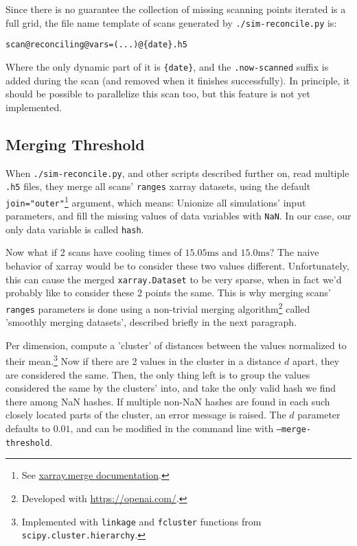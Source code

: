 Since there is no guarantee the collection of missing scanning points iterated is a full grid, the file name template of scans generated by \texttt{./sim-reconcile.py} is:

\begin{verbatim}
scan@reconciling@vars=(...)@{date}.h5
\end{verbatim}

Where the only dynamic part of it is \texttt{\{date\}}, and the \texttt{.now-scanned} suffix is added during the scan (and removed when it finishes successfully). In principle, it should be possible to parallelize this scan too, but this feature is not yet implemented.

\subsection{Merging Threshold}\label{ssec:manual/merge-threshold}

When \texttt{./sim-reconcile.py}, and other scripts described further on, read multiple \texttt{.h5} files, they merge all scans' \texttt{ranges} xarray datasets, using the default \texttt{join="outer"}\footnote{See \href{https://docs.xarray.dev/en/stable/generated/xarray.merge.html}{xarray.merge documentation}.} argument, which means: Unionize all simulations' input parameters, and fill the missing values of data variables with \texttt{NaN}. In our case, our only data variable is called \texttt{hash}.

Now what if 2 scans have cooling times of $15.05\mathrm{ms}$ and $15.0\mathrm{ms}$? The naive behavior of xarray would be to consider these two values different. Unfortunately, this can cause the merged \texttt{xarray.Dataset} to be very sparse, when in fact we'd probably like to consider these 2 points the same. This is why merging scans' \texttt{ranges} parameters is done using a non-trivial merging algorithm\footnote{Developed with \url{https://openai.com/}.} called 'smoothly merging datasets', described briefly in the next paragraph.

Per dimension, compute a 'cluster' of distances between the values normalized to their mean.\footnote{Implemented with \texttt{linkage} and \texttt{fcluster} functions from \texttt{scipy.cluster.hierarchy}\cite{scipy}.} Now if there are 2 values in the cluster in a distance $d$ apart, they are considered the same. Then, the only thing left is to group the values considered the same by the clusters' into, and take the only valid hash we find there among NaN hashes. If multiple non-NaN hashes are found in each such closely located parts of the cluster, an error message is raised. The $d$ parameter defaults to $0.01$, and can be modified in the command line with \texttt{--merge-threshold}.


